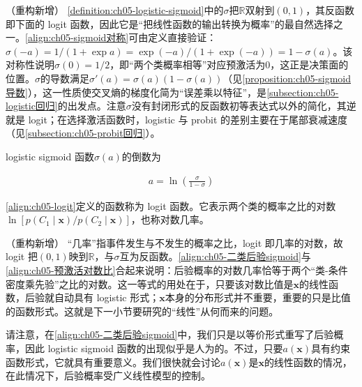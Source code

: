 \documentclass[../../main.tex]{subfiles}
\begin{document}
\begin{remark}（重构新增）
\cref{definition:ch05-logistic-sigmoid}中的$\sigma$把$\mathbb{R}$双射到$(0,1)$，其反函数即下面的 logit 函数，因此它是“把线性函数的输出转换为概率”的最自然选择之一。\eqref{align:ch05-sigmoid对称}可由定义直接验证：$\sigma(-a)=1/(1+\exp a)=\exp(-a)/(1+\exp(-a))=1-\sigma(a)$。该对称性说明$\sigma(0)=1/2$，即“两个类概率相等”对应预激活为0，这正是决策面的位置。$\sigma$的导数满足$\sigma'(a)=\sigma(a)(1-\sigma(a))$（见\cref{proposition:ch05-sigmoid导数}），这一性质使交叉熵的梯度化简为“误差乘以特征”，是\cref{subsection:ch05-logistic回归}的出发点。注意$\sigma$没有封闭形式的反函数初等表达式以外的简化，其逆就是 logit；在选择激活函数时，logistic 与 probit 的差别主要在于尾部衰减速度（见\cref{subsection:ch05-probit回归}）。
\end{remark}

logistic sigmoid 函数$\sigma(a)$的倒数为

\begin{align}
  a=\ln\left(\frac{\sigma}{1-\sigma}\right)
  \label{align:ch05-logit}
\end{align}

\begin{definition}[logit 函数]\label{definition:ch05-logit}
\eqref{align:ch05-logit}定义的函数称为 logit 函数。它表示两个类的概率之比的对数$\ln[p(C_1\mid\boldsymbol{x})/p(C_2\mid\boldsymbol{x})]$，也称对数几率。
\end{definition}

\begin{remark}（重构新增）
“几率”指事件发生与不发生的概率之比，logit 即几率的对数，故 logit 把$(0,1)$映到$\mathbb{R}$，与$\sigma$互为反函数。\eqref{align:ch05-二类后验sigmoid}与\eqref{align:ch05-预激活对数比}合起来说明：后验概率的对数几率恰等于两个“类-条件密度乘先验”之比的对数。这一等式的用处在于，只要该对数比值是$\boldsymbol{x}$的线性函数，后验就自动具有 logistic 形式；$\boldsymbol{x}$本身的分布形式并不重要，重要的只是比值的函数形式。这就是下一小节要研究的“线性”从何而来的问题。
\end{remark}

请注意，在\eqref{align:ch05-二类后验sigmoid}中，我们只是以等价形式重写了后验概率，因此 logistic sigmoid 函数的出现似乎是人为的。不过，只要$a(\boldsymbol{x})$具有约束函数形式，它就具有重要意义。我们很快就会讨论$a(\boldsymbol{x})$是$\boldsymbol{x}$的线性函数的情况，在此情况下，后验概率受广义线性模型的控制。
\end{document}
